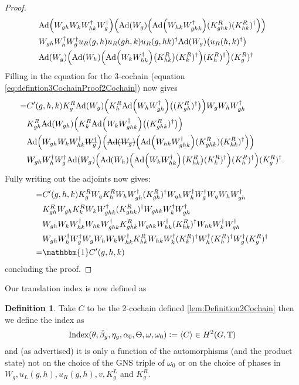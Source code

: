 \documentclass[12pt,a4paper,twoside]{article}
\newcommand{\stkout}[1]{\ifmmode\text{\sout{\ensuremath{#1}}}\else\sout{#1}\fi}
\newcommand{\defeq}{\vcentcolon=}
\let\originalleft\left
\let\originalright\right
\renewcommand{\left}{\mathopen{}\mathclose\bgroup\originalleft}
\renewcommand{\right}{\aftergroup\egroup\originalright}
\newcommand{\TT}{\mathbb T}
\newcommand{\Ad}[1]{\textrm{Ad}\left(#1\right)}
\theoremstyle{definition}
\newtheorem{definition}[theorem]{Definition}
\numberwithin{equation}{section}
\begin{document}
\begin{proof}
\begin{align}
		\nonumber
		&\Ad{W_{gh}W_kW_{hk}^\dagger W_{g}^\dagger}  \left(\Ad{W_g}\left( \Ad{W_{hk}W_{ghk}^\dagger}(K^R_{ghk})(K^R_{hk})^{\dagger} \right)\right)\\
		\nonumber
		&W_{gh}W_h^\dagger W_g^\dagger u_R(g,h) u_R(gh,k)u_R(g,hk)^\dagger\Ad{W_g}\left(u_R(h,k)^\dagger\right)\\
		\nonumber
		&\Ad{W_g}\left(\Ad{W_h}\left(\Ad{W_kW_{hk}^\dagger}\left(K_{hk}^R\right)(K^R_k)^\dagger\right)(K^R_h)^\dagger\right)(K^R_g)^\dagger
	\end{align}
	Filling in the equation for the 3-cochain (equation \eqref{eq:defintion3CochainProof2Cochain}) now gives
	\begin{align}
		=&C'(g,h,k)K_g^R\Ad{W_g}\left(K_h^R\Ad{W_hW_{gh}^\dagger}\left((K_{gh}^R)^\dagger\right)\right)W_gW_hW_{gh}^\dagger \\
		\nonumber
		&K_{gh}^R\Ad{W_{gh}}\left(K_k^R\Ad{W_kW_{ghk}^\dagger}\left((K_{ghk}^R)^\dagger\right)\right)\\
		\nonumber
		&\Ad{W_{gh}W_kW_{hk}^\dagger \stkout{W_{g}^\dagger}}  \left(\stkout{\Ad{W_g}}\left( \Ad{W_{hk}W_{ghk}^\dagger}(K^R_{ghk})(K^R_{hk})^{\dagger} \right)\right)\\
		\nonumber
		&W_{gh}W_h^\dagger W_g^\dagger\Ad{W_g}\left(\Ad{W_h}\left(\Ad{W_kW_{hk}^\dagger}\left(K_{hk}^R\right)(K^R_k)^\dagger\right)(K^R_h)^\dagger\right)(K^R_g)^\dagger.
	\end{align}
	Fully writing out the adjoints now gives:
	\begin{align}
	=&C'(g,h,k)K_g^RW_gK_h^RW_hW_{gh}^\dagger (K_{gh}^R)^\dagger W_{gh}W_h^\dagger W_g^\dagger W_gW_hW_{gh}^\dagger \\
	\nonumber
	&K_{gh}^RW_{gh}K_k^RW_kW_{ghk}^\dagger(K_{ghk}^R)^\dagger W_{ghk}W_k^\dagger W_{gh}^\dagger  \\
	\nonumber
	&W_{gh}W_kW_{hk}^\dagger W_{hk}W_{ghk}^\dagger K^R_{ghk} W_{ghk}W_{hk}^\dagger(K^R_{hk})^{\dagger} W_{hk}W_k^\dagger W_{gh}^\dagger\\
	\nonumber
	&W_{gh}W_h^\dagger W_g^\dagger W_gW_h W_kW_{hk}^\dagger K_{hk}^RW_{hk}W_k^\dagger(K^R_k)^\dagger W_h^\dagger (K^R_h)^\dagger W_g^\dagger (K^R_g)^\dagger\\
	=&\mathbbm{1}C'(g,h,k)
	\end{align}
	concluding the proof.
\end{proof}
Our translation index is now defined as
\begin{definition}
	Take $C$ to be the 2-cochain defined \ref{lem:Definition2Cochain} then we define the index as
	\begin{equation}
	\textrm{Index}(\theta,\tilde{\beta}_g,\eta_g,\alpha_0,\Theta,\omega,\omega_0)\defeq\expval{C}\in H^2(G,\TT)
	\end{equation}
	and (as advertised) it is only a function of the automorphisms (and the product state) not on the choice of the GNS triple of $\omega_0$ or on the choice of phases in $W_g,u_L(g,h),u_R(g,h),v,K_g^L$ and $K_g^R$.
\end{definition}
\end{document}
